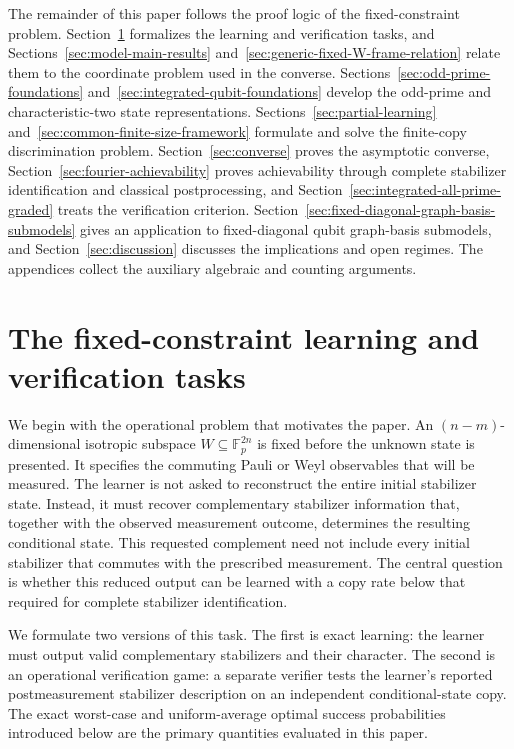\documentclass[11pt]{article}
\newcommand{\F}{\mathbb F}
\newcommand{\1}{\mathbf 1}
\theoremstyle{plain}
\theoremstyle{definition}
\theoremstyle{remark}
\begin{document}
The remainder of this paper follows the proof logic of the fixed-constraint problem. Section~\ref{sec:fixed-W-main-results} formalizes the learning and verification tasks, and Sections~\ref{sec:model-main-results} and~\ref{sec:generic-fixed-W-frame-relation} relate them to the coordinate problem used in the converse. Sections~\ref{sec:odd-prime-foundations} and~\ref{sec:integrated-qubit-foundations} develop the odd-prime and characteristic-two state representations. Sections~\ref{sec:partial-learning} and~\ref{sec:common-finite-size-framework} formulate and solve the finite-copy discrimination problem. Section~\ref{sec:converse} proves the asymptotic converse, Section~\ref{sec:fourier-achievability} proves achievability through complete stabilizer identification and classical postprocessing, and Section~\ref{sec:integrated-all-prime-graded} treats the verification criterion. Section~\ref{sec:fixed-diagonal-graph-basis-submodels} gives an application to fixed-diagonal qubit graph-basis submodels, and Section~\ref{sec:discussion} discusses the implications and open regimes. The appendices collect the auxiliary algebraic and counting arguments.  
\section{The fixed-constraint learning and verification tasks}
\label{sec:fixed-W-main-results}

We begin with the operational problem that motivates the paper.  An
$(n-m)$-dimensional isotropic subspace $W\subseteq\F_p^{2n}$ is fixed before
the unknown state is presented.  It specifies the commuting Pauli or Weyl
observables that will be measured.  The learner is not asked to reconstruct the
entire initial stabilizer state.  Instead, it must recover complementary
stabilizer information that, together with the observed measurement outcome,
determines the resulting conditional state.  This requested complement need
not include every initial stabilizer that commutes with the prescribed
measurement.  The central question is whether this reduced output can be
learned with a copy rate below that required for complete stabilizer
identification.

We formulate two versions of this task.  The first is exact learning: the
learner must output valid complementary stabilizers and their character.  The
second is an operational verification game: a separate verifier tests the
learner's reported postmeasurement stabilizer description on an independent
conditional-state copy.  The exact worst-case and uniform-average optimal
success probabilities introduced below are the primary quantities evaluated in
this paper.
\end{document}
